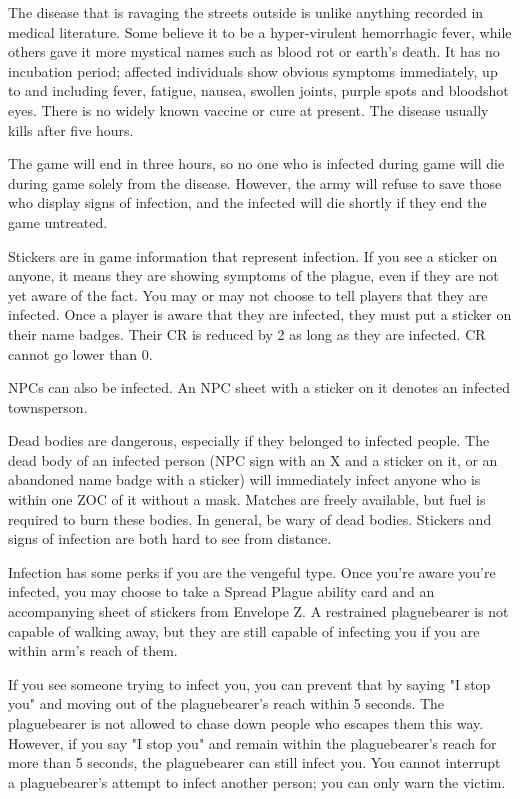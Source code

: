 \documentclass[green]{Pestilence}
\begin{document}
\name{\gInfection{}}

The disease that is ravaging the streets outside is unlike anything recorded in medical literature. Some believe it to be a hyper-virulent hemorrhagic fever, while others gave it more mystical names such as blood rot or earth's death. It has no incubation period; affected individuals show obvious symptoms immediately, up to and including fever, fatigue, nausea, swollen joints, purple spots and bloodshot eyes. There is no widely known vaccine or cure at present. The disease usually kills after five hours.

The game will end in three hours, so no one who is infected during game will die during game solely from the disease. However, the army will refuse to save those who display signs of infection, and the infected will die shortly if they end the game untreated.

Stickers are in game information that represent infection. If you see a sticker on anyone, it means they are showing symptoms of the plague, even if they are not yet aware of the fact. You may or may not choose to tell players that they are infected. Once a player is aware that they are infected, they must put a sticker on their name badges. Their CR is reduced by 2 as long as they are infected. CR cannot go lower than 0.

NPCs can also be infected. An NPC sheet with a sticker on it denotes an infected townsperson.

Dead bodies are dangerous, especially if they belonged to infected people. The dead body of an infected person (NPC sign with an X and a sticker on it, or an abandoned name badge with a sticker) will immediately infect anyone who is within one ZOC of it without a mask. Matches are freely available, but fuel is required to burn these bodies. In general, be wary of dead bodies. Stickers and signs of infection are both hard to see from distance.

Infection has some perks if you are the vengeful type. Once you're aware you're infected, you may choose to take a Spread Plague ability card and an accompanying sheet of stickers from Envelope Z. A restrained plaguebearer is not capable of walking away, but they are still capable of infecting you if you are within arm's reach of them. 

If you see someone trying to infect you, you can prevent that by saying "I stop you" and moving out of the plaguebearer's reach within 5 seconds. The plaguebearer is not allowed to chase down people who escapes them this way. However, if you say "I stop you" and remain within the plaguebearer's reach for more than 5 seconds, the plaguebearer can still infect you. You cannot interrupt a plaguebearer's attempt to infect another person; you can only warn the victim.    
\end{document}
